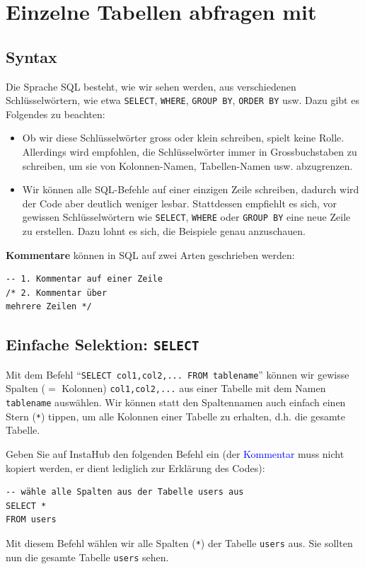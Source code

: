 \chapter{Einzelne Tabellen abfragen mit \texorpdfstring{}{SQL}}\label{ch:abfragen}

\section{Syntax}
Die Sprache \acrfull{SQL} besteht, wie wir sehen werden, aus verschiedenen Schlüsselwörtern, wie etwa \lstinline|SELECT|, \lstinline|WHERE|, \lstinline|GROUP BY|, \lstinline|ORDER BY| usw. Dazu gibt es Folgendes zu beachten:
\begin{itemize}
  \item Ob wir diese Schlüsselwörter gross oder klein schreiben, spielt keine Rolle. Allerdings wird empfohlen, die Schlüsselwörter immer in Grossbuchstaben zu schreiben, um sie von Kolonnen-Namen, Tabellen-Namen usw. abzugrenzen.
  \item Wir können alle \gls{SQL}-Befehle auf einer einzigen Zeile schreiben, dadurch wird der Code aber deutlich weniger lesbar. Stattdessen empfiehlt es sich, vor gewissen Schlüsselwörtern wie \lstinline|SELECT|, \lstinline|WHERE| oder \lstinline|GROUP BY| eine neue Zeile zu erstellen. Dazu lohnt es sich, die Beispiele genau anzuschauen.
\end{itemize}

\textbf{Kommentare} können in \gls{SQL} auf zwei Arten geschrieben werden:

\begin{lstlisting}
-- 1. Kommentar auf einer Zeile
/* 2. Kommentar über
mehrere Zeilen */
\end{lstlisting}

\section{Einfache Selektion: \texorpdfstring{\lstinline|SELECT|}{SELECT}}

Mit dem Befehl \enquote{\lstinline|SELECT col1,col2,... FROM tablename|} können wir gewisse Spalten ($=$ Kolonnen) \lstinline|col1,col2,...| aus einer Tabelle mit dem Namen \lstinline|tablename| auswählen. Wir können statt den Spaltennamen auch einfach einen Stern (\texttt{*}) tippen, um alle Kolonnen einer Tabelle zu erhalten, d.h. die gesamte Tabelle.


\begin{myexample}
Geben Sie auf InstaHub den folgenden Befehl ein (der \textcolor{blue}{Kommentar} muss nicht kopiert werden, er dient lediglich zur Erklärung des Codes):

\begin{lstlisting}
-- wähle alle Spalten aus der Tabelle users aus
SELECT *
FROM users
\end{lstlisting}

Mit diesem Befehl wählen wir alle Spalten (\lstinline|*|) der Tabelle \lstinline|users| aus.
Sie sollten nun die gesamte Tabelle \texttt{users} sehen.
\end{myexample}

